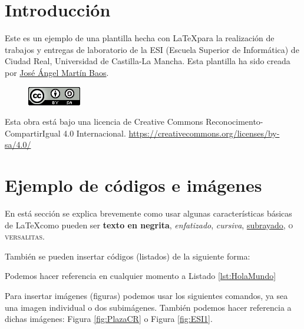 \documentclass[11pt]{article}
\begin{document}
\begin{titlepage}
	\vfill
	
\end{titlepage}


\tableofcontents
\pagebreak


\section{Introducción}
Este es un ejemplo de una plantilla hecha con \LaTeX para la realización de trabajos y entregas de laboratorio de la ESI (Escuela Superior de Informática) de Ciudad Real, Universidad de Castilla-La Mancha. Esta plantilla ha sido creada por \href{https://github.com/JoseAngelMartinB}{José Ángel Martín Baos}.


\begin{figure}[H] 
	\centering
	\includegraphics[angle=0]{licencia}
\end{figure}	
Esta obra está bajo una licencia de Creative Commons Reconocimento-CompartirIgual 4.0 Internacional.
\href{https://creativecommons.org/licenses/by-sa/4.0/}{https://creativecommons.org/licenses/by-sa/4.0/}


\section{Ejemplo de códigos e imágenes}
En está sección se explica brevemente como usar algunas características básicas de \LaTeX como pueden ser \textbf{texto en negrita}, \emph{enfatizado}, \textit{cursiva}, \underline{subrayado}, \textsc{o versalitas}.

También se pueden insertar códigos (listados) de la siguiente forma:


Podemos hacer referencia en cualquier momento a Listado \ref{lst:HolaMundo}

Para insertar imágenes (figuras) podemos usar los siguientes comandos, ya sea una imagen individual o dos subimágenes. También podemos hacer referencia a dichas imágenes: Figura \ref{fig:PlazaCR} o Figura \ref{fig:ESI1}.
\end{document}
